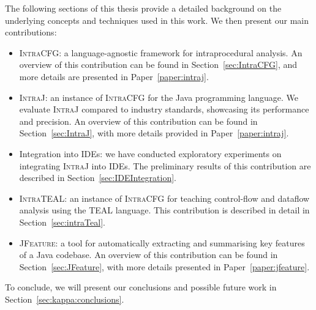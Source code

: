 The following sections of this thesis provide a detailed background on the 
underlying concepts and techniques used in this work. We then present our main contributions:
\begin{itemize}
	\item \textsc{IntraCFG}: a language-agnostic framework for intraprocedural analysis.
	 An overview of this contribution can be found in Section~\ref{sec:IntraCFG}, and more details are presented in Paper~\ref{paper:intraj}.
	\item \textsc{IntraJ}: an instance of \textsc{IntraCFG} for the Java programming language. 
	We evaluate \textsc{IntraJ} compared to industry standards, showcasing its 
	performance and precision. An overview of this contribution can be found in Section~\ref{sec:IntraJ},
	with more details provided in Paper~\ref{paper:intraj}.
	\item Integration into IDEs: we have conducted exploratory experiments on integrating
	\textsc{IntraJ} into IDEs. The preliminary results of this contribution are described in Section~\ref{sec:IDEIntegration}.
	\item \textsc{IntraTEAL}: an instance of \textsc{IntraCFG} for teaching control-flow and  dataflow analysis using the TEAL language.
	This contribution is described in detail in Section~\ref{sec:intraTeal}.
	\item \textsc{JFeature}: a tool for automatically extracting and summarising key 
	features of a Java codebase. An overview of this contribution can be found 
	in Section~\ref{sec:JFeature}, with more details presented in Paper~\ref{paper:jfeature}.

\end{itemize}

To conclude, we will present our conclusions and possible future work in Section~\ref{sec:kappa:conclusions}.



